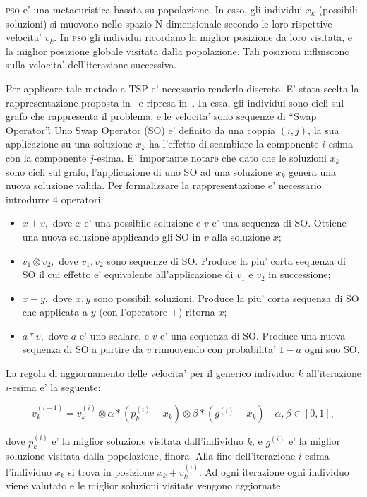 \documentclass[
12pt, %
a4paper, %
oneside, %
headinclude,footinclude, %
BCOR5mm, %
]{scrartcl}
\begin{document}
\textsc{pso} e' una metaeuristica basata su popolazione. In esso, gli individui $x_k$ (possibili soluzioni) si muovono nello spazio N-dimensionale secondo le loro rispettive velocita' $v_k$. In \textsc{pso} gli individui ricordano la miglior posizione da loro visitata, e la miglior posizione globale visitata dalla popolazione. Tali posizioni influiscono sulla velocita' dell'iterazione successiva. 

Per applicare tale metodo a TSP e' necessario renderlo discreto. E' stata scelta la rappresentazione proposta in~\cite{1259748} e ripresa in~\cite{shi2007particle}. In essa, gli individui sono cicli sul grafo che rappresenta il problema, e le velocita' sono sequenze di ``Swap Operator''. Uno Swap Operator (SO) e' definito da una coppia $(i, j)$, la sua applicazione su una soluzione $x_k$ ha l'effetto di scambiare la componente $i$-esima con la componente $j$-esima. E' importante notare che dato che le soluzioni $x_k$ sono cicli sul grafo, l'applicazione di uno SO ad una soluzione $x_k$ genera una nuova soluzione valida. Per formalizzare la rappresentazione  e' necessario introdurre 4 operatori:
\begin{itemize}
\item $x + v,$ dove $x$ e' una possibile soluzione e $v$ e' una sequenza di SO. Ottiene una nuova soluzione applicando gli SO in $v$ alla soluzione $x$;
\item $v_1 \otimes v_2,$ dove $v_1, v_2$ sono sequenze di SO. Produce la piu' corta sequenza di SO il cui effetto e' equivalente all'applicazione di $v_1$ e $v_2$ in successione;
\item $x-y,$ dove $x, y$ sono possibili soluzioni. Produce la piu' corta sequenza di SO che applicata a $y$ (con l'operatore $+$) ritorna $x$;
\item $a * v,$ dove $a$ e' uno scalare, e $v$ e' una sequenza di SO. Produce una nuova sequenza di SO a partire da $v$ rimuovendo con probabilita' $1-a$ ogni suo SO.
\end{itemize}
La regola di aggiornamento delle velocita' per il generico individuo $k$ all'iterazione $i$-esima e' la seguente:

\[ v^{(i+1)}_k = v_k^{(i)} \otimes \alpha \ast (p_k^{(i)} - x_k) \otimes \beta \ast (g^{(i)} - x_k) \quad \alpha, \beta \in [0, 1], \]

dove $p_k^{(i)}$ e' la miglior soluzione visitata dall'individuo $k$, e $g^{(i)}$ e' la miglior soluzione visitata dalla popolazione, finora. Alla fine dell'iterazione $i$-esima l'individuo $x_k$ si trova in posizione $x_k + v_k^{(i)}$. Ad ogni iterazione ogni individuo viene valutato e le miglior soluzioni visitate vengono aggiornate.
\end{document}
